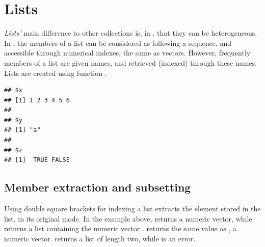 \documentclass[krantz2]{krantz}\usepackage{knitr}
\begin{document}

\section{Lists}\label{sec:calc:lists}
\emph{Lists'} main difference to other collections is, in \Rlang, that they can be heterogeneous. In \Rlang, the members of a list can be considered as following a sequence, and accessible through numerical indexes, the same as vectors. However, frequently members of a list are given names, and retrieved (indexed) through these names. Lists are created using function .

\begin{knitrout}\footnotesize
{}\color{fgcolor}\begin{kframe}
\begin{alltt}
 \hlkwb{<-} \hlstd{(} \hlstd{=} \hlopt{:}\hlstd{,}  \hlstd{=} \hlstd{,}  \hlstd{=} \hlstd{(}\hlstd{,} \hlstd{))}
\end{alltt}
\begin{verbatim}
## $x
## [1] 1 2 3 4 5 6
## 
## $y
## [1] "a"
## 
## $z
## [1]  TRUE FALSE
\end{verbatim}
\end{kframe}
\end{knitrout}

\subsection{Member extraction and subsetting}
Using\qRoperator{[[]]} double square brackets for indexing a list extracts the element stored in the list, in its original mode. In the example above,  returns a numeric vector, while  returns a list containing the numeric vector .  returns the same value as , a numeric vector.  returns a list of length two, while  is an error.
\end{document}
